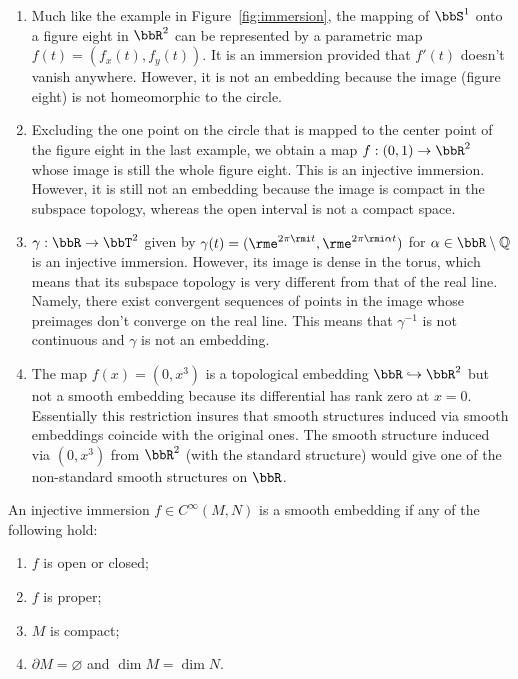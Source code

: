 \begin{example}
\begin{enumerate}
    \item Much like the example in Figure~\ref{fig:immersion}, the mapping of $\bbS^1$ onto a figure eight in $\bbR^2$ can be represented by a parametric map $f(t)=(f_x(t),f_y(t))$. It is an immersion provided that $f'(t)$ doesn't vanish anywhere. However, it is not an embedding because the image (figure eight) is not homeomorphic to the circle.
    \item Excluding the one point on the circle that is mapped to the center point of the figure eight in the last example, we obtain a map $f:(0,1)\to \bbR^2$ whose image is still the whole figure eight. This is an injective immersion. However, it is still not an embedding because the image is compact in the subspace topology, whereas the open interval is not a compact space.
    \item $\gamma:\bbR \to \bbT^2$ given by $\gamma(t)=(\rme^{2\pi\rmi t},\rme^{2\pi\rmi \alpha t})$ for $\alpha\in\bbR \setminus\mathbb{Q}$ is an injective immersion. However, its image is dense in the torus, which means that its subspace topology is very different from that of the real line. Namely, there exist convergent sequences of points in the image whose preimages don't converge on the real line. This means that $\gamma^{-1}$ is not continuous and $\gamma$ is not an embedding.
    \item The map $f(x)=(0,x^3)$ is a topological embedding $\bbR \hookrightarrow\bbR^2$ but not a smooth embedding because its differential has rank zero at $x=0$. Essentially this restriction insures that smooth structures induced via smooth embeddings coincide with the original ones. The smooth structure induced via $(0,x^3)$ from $\bbR^2$ (with the standard structure) would give one of the non-standard smooth structures on $\bbR $.
\end{enumerate}
\end{example}

\begin{prop}
An injective immersion $f\in C^\infty (M,N)$ is a smooth embedding if any of the following hold:
\begin{enumerate}
    \item $f$ is open or closed;
    \item $f$ is proper;
    \item $M$ is compact;
    \item $\partial M=\varnothing$ and $\dim M=\dim N$.
\end{enumerate}
\end{prop}

